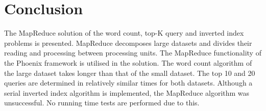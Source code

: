 \documentclass[a4paper, 11pt, twocolumn, conference]{IEEEtran}      %
\begin{document}
\section{Conclusion}
The MapReduce solution of the word count, top-K query and inverted index problems is presented. MapReduce decomposes large datasets and divides their reading and processing between processing units. The MapReduce functionality of the Phoenix framework is utilised in the solution. The word count algorithm of the large dataset takes longer than that of the small dataset. The top 10 and 20 queries are determined in relatively similar times for both datasets. Although a serial inverted index algorithm is implemented, the MapReduce algorithm was unsuccessful. No running time tests are performed due to this. 

 


\end{document}
